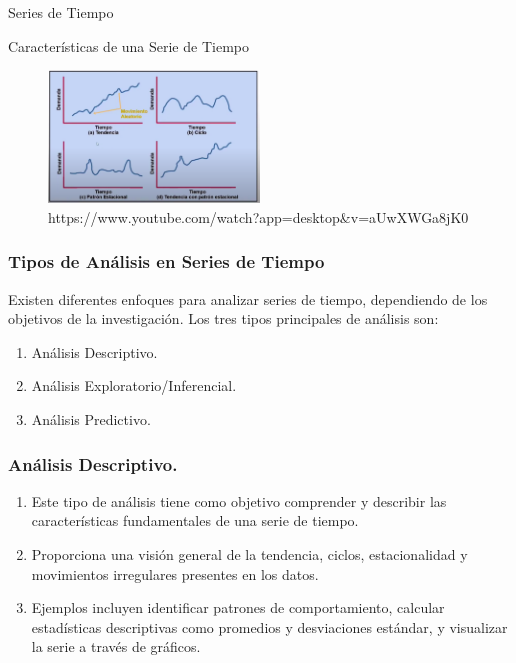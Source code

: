 \documentclass{beamer}
\begin{document}
\begin{frame}{Series de Tiempo}
    \begin{block}{Características de una Serie de Tiempo}
        \begin{figure}
            \centering
            \includegraphics[width=0.5\textwidth]{Caracteristiucas.png}
            \caption{https://www.youtube.com/watch?app=desktop\&v=aUwXWGa8jK0}
        \end{figure}
    \end{block}
\end{frame}

\begin{frame}
  \frametitle{Tipos de Análisis en Series de Tiempo}
  Existen diferentes enfoques para analizar series de tiempo, dependiendo de los objetivos de la investigación. Los tres tipos principales de análisis son:
  \begin{enumerate}
    \item Análisis Descriptivo.
    \item Análisis Exploratorio/Inferencial.
    \item Análisis Predictivo.
  \end{enumerate}
\end{frame}

\begin{frame}
	\frametitle{Análisis Descriptivo.}
	\begin{enumerate}
		\item Este tipo de análisis tiene como objetivo comprender y describir las características fundamentales de una serie de tiempo.
		\item Proporciona una visión general de la tendencia, ciclos, estacionalidad y movimientos irregulares presentes en los datos.
		\item Ejemplos incluyen identificar patrones de comportamiento, calcular estadísticas descriptivas como promedios y desviaciones estándar, y visualizar la serie a través de gráficos.
	\end{enumerate}
\end{frame}
\end{document}
